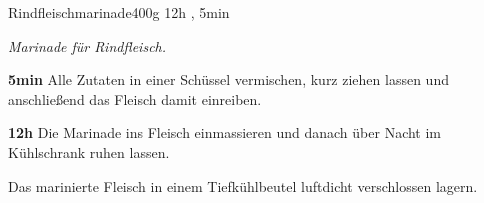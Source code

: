 \documentclass[../recipe-collections/cooking.tex]{subfiles}
\begin{document}
\begin{recipe}{Rindfleischmarinade}{400g }{12h , 5min }

  \freeform{}\textit{Marinade für Rindfleisch.}


  \textbf{5min}
  Alle Zutaten in einer Schüssel vermischen, kurz ziehen lassen und anschließend das Fleisch damit einreiben.

  \newstep{}\textbf{12h}
  Die Marinade ins Fleisch einmassieren und danach über Nacht im Kühlschrank ruhen lassen.

  \freeform{}\hrulefill{}

  \freeform{}
  Das marinierte Fleisch in einem Tiefkühlbeutel luftdicht verschlossen lagern.

\end{recipe}
\end{document}
